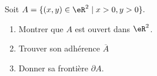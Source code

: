 \begin{exercice}[\minsyndical]\label{exoEspVectoNorme0002}

Soit $ A = \{( x, y) \in \eR^2 \; | \; x>0, y > 0 \}. $ 
\begin{enumerate}
	\item
		Montrer que $A$ est ouvert dans $\eR^2$.
	\item
		Trouver son adhérence $\overline{A}$ 
	\item
		Donner sa frontière $\partial A$. 

\end{enumerate}

\end{exercice}


